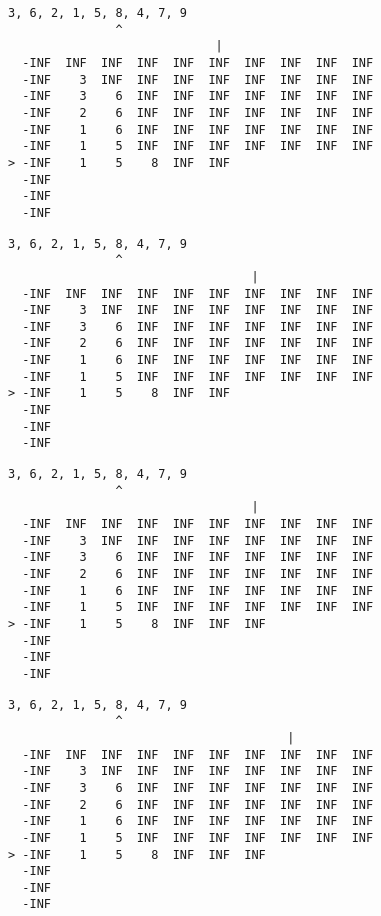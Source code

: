 { \begin{verbatim}
3, 6, 2, 1, 5, 8, 4, 7, 9
               ^
                             |
  -INF  INF  INF  INF  INF  INF  INF  INF  INF  INF
  -INF    3  INF  INF  INF  INF  INF  INF  INF  INF
  -INF    3    6  INF  INF  INF  INF  INF  INF  INF
  -INF    2    6  INF  INF  INF  INF  INF  INF  INF
  -INF    1    6  INF  INF  INF  INF  INF  INF  INF
  -INF    1    5  INF  INF  INF  INF  INF  INF  INF
> -INF    1    5    8  INF  INF                    
  -INF                                             
  -INF                                             
  -INF                                             
\end{verbatim} }

{ \begin{verbatim}
3, 6, 2, 1, 5, 8, 4, 7, 9
               ^
                                  |
  -INF  INF  INF  INF  INF  INF  INF  INF  INF  INF
  -INF    3  INF  INF  INF  INF  INF  INF  INF  INF
  -INF    3    6  INF  INF  INF  INF  INF  INF  INF
  -INF    2    6  INF  INF  INF  INF  INF  INF  INF
  -INF    1    6  INF  INF  INF  INF  INF  INF  INF
  -INF    1    5  INF  INF  INF  INF  INF  INF  INF
> -INF    1    5    8  INF  INF                    
  -INF                                             
  -INF                                             
  -INF                                             
\end{verbatim} }

{ \begin{verbatim}
3, 6, 2, 1, 5, 8, 4, 7, 9
               ^
                                  |
  -INF  INF  INF  INF  INF  INF  INF  INF  INF  INF
  -INF    3  INF  INF  INF  INF  INF  INF  INF  INF
  -INF    3    6  INF  INF  INF  INF  INF  INF  INF
  -INF    2    6  INF  INF  INF  INF  INF  INF  INF
  -INF    1    6  INF  INF  INF  INF  INF  INF  INF
  -INF    1    5  INF  INF  INF  INF  INF  INF  INF
> -INF    1    5    8  INF  INF  INF               
  -INF                                             
  -INF                                             
  -INF                                             
\end{verbatim} }

{ \begin{verbatim}
3, 6, 2, 1, 5, 8, 4, 7, 9
               ^
                                       |
  -INF  INF  INF  INF  INF  INF  INF  INF  INF  INF
  -INF    3  INF  INF  INF  INF  INF  INF  INF  INF
  -INF    3    6  INF  INF  INF  INF  INF  INF  INF
  -INF    2    6  INF  INF  INF  INF  INF  INF  INF
  -INF    1    6  INF  INF  INF  INF  INF  INF  INF
  -INF    1    5  INF  INF  INF  INF  INF  INF  INF
> -INF    1    5    8  INF  INF  INF               
  -INF                                             
  -INF                                             
  -INF                                             
\end{verbatim} }

